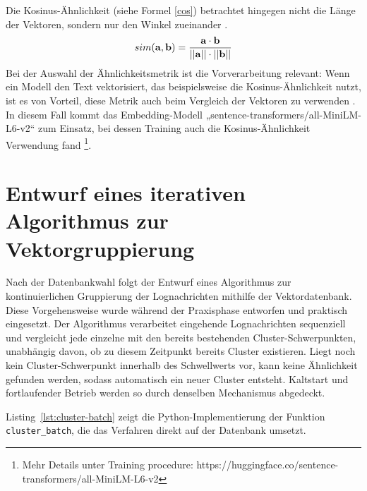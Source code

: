 Die Kosinus-Ähnlichkeit (siehe Formel \ref{cos}) betrachtet hingegen nicht die Länge der Vektoren, sondern nur den Winkel zueinander \cite{pineconeVectorSimilarity}.
\begin{equation}
  sim(\bold{a},\bold{b}) = \frac{\bold{a}\cdot \bold{b}}{||\bold{a}||\cdot||\bold{b}||}
  \label{cos}
\end{equation}
Bei der Auswahl der Ähnlichkeitsmetrik ist die Vorverarbeitung relevant: Wenn ein Modell den Text vektorisiert, das beispielsweise die Kosinus-Ähnlichkeit nutzt, ist es von Vorteil, diese Metrik auch beim Vergleich der Vektoren zu verwenden \cite{pineconeVectorSimilarity}. In diesem Fall kommt das Embedding-Modell „sentence-transformers/all-MiniLM-L6-v2“ zum Einsatz, bei dessen Training auch die Kosinus-Ähnlichkeit Verwendung fand \footnote{Mehr Details unter Training procedure: https://huggingface.co/sentence-transformers/all-MiniLM-L6-v2}.

\section{Entwurf eines iterativen Algorithmus zur Vektorgruppierung}\label{PG_Algorithmn}
Nach der Datenbankwahl folgt der Entwurf eines Algorithmus zur kontinuierlichen Gruppierung der Lognachrichten mithilfe der Vektordatenbank. Diese Vorgehensweise wurde während der Praxisphase entworfen und praktisch eingesetzt. Der Algorithmus verarbeitet eingehende Lognachrichten sequenziell und vergleicht jede einzelne mit den bereits bestehenden Cluster-Schwerpunkten, unabhängig davon, ob zu diesem Zeitpunkt bereits Cluster existieren. Liegt noch kein Cluster-Schwerpunkt innerhalb des Schwellwerts vor, kann keine Ähnlichkeit gefunden werden, sodass automatisch ein neuer Cluster entsteht. Kaltstart und fortlaufender Betrieb werden so durch denselben Mechanismus abgedeckt.

Listing~\ref{lst:cluster-batch} zeigt die Python-Implementierung der Funktion \texttt{cluster\_batch}, die das Verfahren direkt auf der Datenbank umsetzt.


